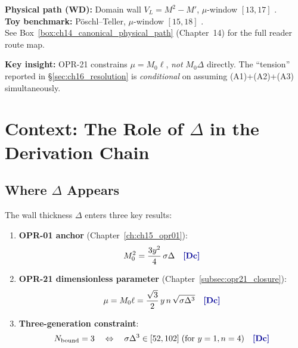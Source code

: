 \begin{tcolorbox}[colback=green!3!white, colframe=green!40!black,
    title=\textbf{Canonical Path Reminder}]
\textbf{Physical path (WD):} Domain wall $V_L = M^2 - M'$, $\mu$-window $[13, 17]$ \tagDc{}.\\
\textbf{Toy benchmark:} Pöschl--Teller, $\mu$-window $[15, 18]$ \tagM{}.\\[3pt]
See Box~\ref{box:ch14_canonical_physical_path} (Chapter~14) for the full reader route map.
\end{tcolorbox}

\medskip
\textbf{Key insight:} OPR-21 constrains $\mu = M_0 \ell$, \emph{not} $M_0\Delta$
directly. The ``tension'' reported in \S\ref{sec:ch16_resolution} is
\emph{conditional} on assuming (A1)+(A2)+(A3) simultaneously.

\section{Context: The Role of $\Delta$ in the Derivation Chain}
\label{sec:ch16_context}

\subsection{Where $\Delta$ Appears}
\label{subsec:ch16_where_delta}

The wall thickness $\Delta$ enters three key results:

\begin{enumerate}
    \item \textbf{OPR-01 anchor} (Chapter~\ref{ch:ch15_opr01}):
    \begin{equation}
        M_0^2 = \frac{3 y^2}{4} \, \sigma \Delta
        \quad \tagDc{}
        \label{eq:ch16:M0_from_opr01}
    \end{equation}

    \item \textbf{OPR-21 dimensionless parameter} (Chapter~\ref{subsec:opr21_closure}):
    \begin{equation}
        \mu = M_0 \ell = \frac{\sqrt{3}}{2} \, y \, n \, \sqrt{\sigma \Delta^3}
        \quad \tagDc{}
        \label{eq:ch16:mu_geometric}
    \end{equation}

    \item \textbf{Three-generation constraint}:
    \begin{equation}
        N_{\mathrm{bound}} = 3 \quad \Leftrightarrow \quad
        \sigma \Delta^3 \in [52, 102] \; (\text{for } y = 1, n = 4)
        \quad \tagDc{}
        \label{eq:ch16:Nbound3_constraint}
    \end{equation}
\end{enumerate}


